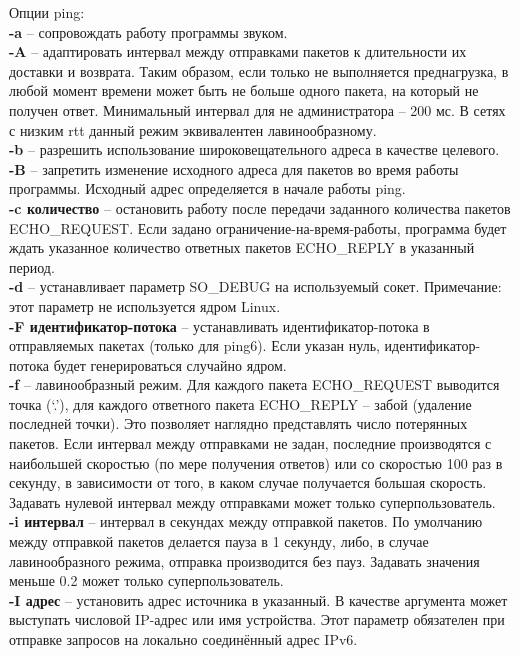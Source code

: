 \documentclass[a4paper]{article}
\begin{document}
			Опции ping:\\
\textbf{-a} -- сопровождать работу программы звуком.\\
\textbf{-A} -- адаптировать интервал между отправками пакетов к длительности их доставки и возврата. Таким образом, если только не выполняется преднагрузка, в любой момент времени может быть не больше одного пакета, на который не получен ответ. Минимальный интервал для не администратора -- 200 мс. В сетях с низким rtt данный режим эквивалентен лавинообразному.\\
\textbf{-b} -- разрешить использование широковещательного адреса в качестве целевого.\\
\textbf{-B} -- запретить изменение исходного адреса для пакетов во время работы программы. Исходный адрес определяется в начале работы ping.\\
\textbf{-c количество} -- остановить работу после передачи заданного количества пакетов ECHO\_REQUEST. Если задано ограничение-на-время-работы, программа будет ждать указанное количество ответных пакетов ECHO\_REPLY в указанный период.\\
\textbf{-d} -- устанавливает параметр SO\_DEBUG на используемый сокет. Примечание: этот параметр не используется ядром Linux.\\
\textbf{-F идентификатор-потока} -- устанавливать идентификатор-потока в отправляемых пакетах (только для ping6). Если указан нуль, идентификатор-потока будет генерироваться случайно ядром.\\
\textbf{-f} -- лавинообразный режим. Для каждого пакета ECHO\_REQUEST выводится точка (`.'), для каждого ответного пакета ECHO\_REPLY -- забой (удаление последней точки). Это позволяет наглядно представлять число потерянных пакетов. Если интервал между отправками не задан, последние производятся с наибольшей скоростью (по мере получения ответов) или со скоростью 100 раз в секунду, в зависимости от того, в каком случае получается большая скорость. Задавать нулевой интервал между отправками может только суперпользователь.\\
\textbf{-i интервал} -- интервал в секундах между отправкой пакетов. По умолчанию между отправкой пакетов делается пауза в 1 секунду, либо, в случае лавинообразного режима, отправка производится без пауз. Задавать значения меньше 0.2 может только суперпользователь.\\
\textbf{-I адрес} -- установить адрес источника в указанный. В качестве аргумента может выступать числовой IP-адрес или имя устройства. Этот параметр обязателен при отправке запросов на локально соединённый адрес IPv6.\\
\end{document}
